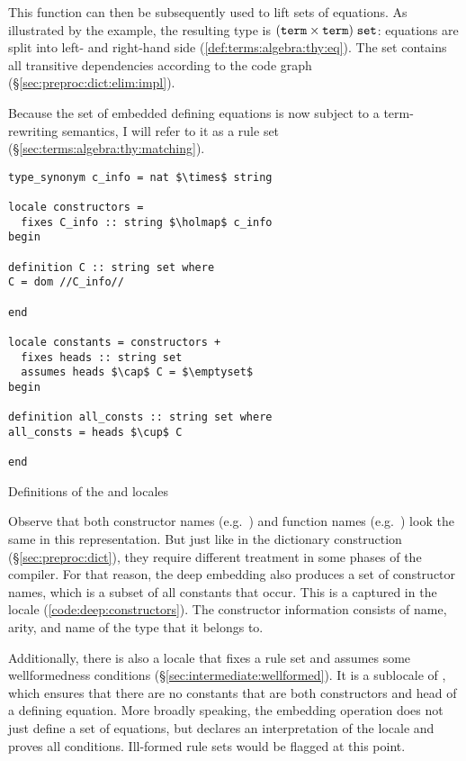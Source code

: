 This function can then be subsequently used to lift sets of equations.
As illustrated by the example, the resulting type is $(\texttt{\textup{term}} \times \texttt{\textup{term}})\;\texttt{\textup{set}}$: equations are split into left- and right-hand side (\cref{def:terms:algebra:thy:eq}).
The set contains all transitive dependencies according to the code graph (§\ref{sec:preproc:dict:elim:impl}).

Because the set of embedded defining equations is now subject to a term-rewriting semantics, I will refer to it as a rule set (§\ref{sec:terms:algebra:thy:matching}).

\begin{code}[t]
  \begin{lstlisting}
type_synonym c_info = nat $\times$ string

locale constructors =
  fixes C_info :: string $\holmap$ c_info
begin

definition C :: string set where
C = dom //C_info//

end

locale constants = constructors +
  fixes heads :: string set
  assumes heads $\cap$ C = $\emptyset$
begin

definition all_consts :: string set where
all_consts = heads $\cup$ C

end\end{lstlisting}
  \caption{Definitions of the  and  locales}
  \label{code:deep:constructors}
\end{code}

Observe that both constructor names (e.g.\ ) and function names (e.g.\ ) look the same in this representation.
But just like in the dictionary construction (§\ref{sec:preproc:dict}), they require different treatment in some phases of the compiler.
For that reason, the deep embedding also produces a set of constructor names, which is a subset of all constants that occur.
This is a captured in the  locale (\cref{code:deep:constructors}).
The constructor information consists of name, arity, and name of the type that it belongs to.

Additionally, there is also a locale that fixes a rule set and assumes some wellformedness conditions (§\ref{sec:intermediate:wellformed}).
It is a sublocale of , which ensures that there are no constants that are both constructors and head of a defining equation.
More broadly speaking, the embedding operation does not just define a set of equations, but declares an interpretation of the locale and proves all conditions.
Ill-formed rule sets would be flagged at this point.

